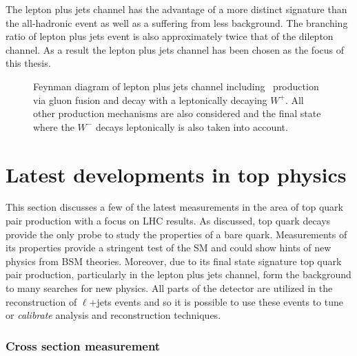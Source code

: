 The lepton plus jets channel has the advantage of a more distinct signature than the all-hadronic event as well as a suffering from less background. The branching ratio of lepton plus jets event is also approximately twice that of the dilepton channel. As a result the lepton plus jets channel has been chosen as the focus of this thesis.

\begin{figure}[htbp]
  \centering
  \begin{minipage}[][][t]{.60\textwidth}
  
  \end{minipage}
  \caption[Feynman diagram of lepton plus jets channel including \ttbar\ production via gluon fusion and decay with a leptonically decaying $W^{+}$.]{Feynman diagram of lepton plus jets channel including \ttbar\ production via gluon fusion and decay with a leptonically decaying $W^{+}$. All other production mechanisms are also considered and the final state where the $W^-$ decays leptonically is also taken into account.} \label{fig:TopQuarkFullLPlusJets}
\end{figure}

\section{Latest developments in top physics}

This section discusses a few of the latest measurements in the area of top quark pair production with a focus on LHC results. As discussed, top quark decays provide the only probe to study the properties of a bare quark. Measurements of its properties provide a stringent test of the SM and could show hints of new physics from BSM theories. Moreover, due to its final state signature top quark pair production, particularly in the lepton plus jets channel, form the background to many searches for new physics.  All parts of the detector are utilized in the reconstruction of $\ell$+jets events and so it is possible to use these events to tune or \textit{calibrate} analysis and reconstruction techniques.

\subsubsection{Cross section measurement}

